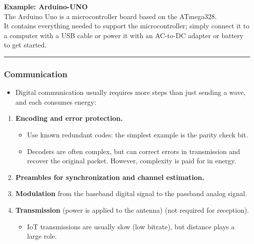 \documentclass[
]{article}
\providecommand{\tightlist}{%
  \setlength{\itemsep}{0pt}\setlength{\parskip}{0pt}}
\begin{document}
\textbf{Example: Arduino-UNO}\\
The Arduino Uno is a microcontroller board based on the ATmega328.\\
It contains everything needed to support the microcontroller; simply
connect it to a computer with a USB cable or power it with an AC-to-DC
adapter or battery to get started.

\begin{center}\rule{0.5\linewidth}{0.5pt}\end{center}

\subsubsection{Communication}\label{communication}

\begin{itemize}
\tightlist
\item
  Digital communication usually requires more steps than just sending a
  wave, and each consumes energy:
\end{itemize}

\begin{enumerate}
\tightlist
\item
  \textbf{Encoding and error protection.}

  \begin{itemize}
  \tightlist
  \item
    Use known redundant codes: the simplest example is the parity check
    bit.
  \item
    Decoders are often complex, but can correct errors in transmission
    and recover the original packet. However, complexity is paid for in
    energy.\\
  \end{itemize}
\item
  \textbf{Preambles for synchronization and channel estimation.}
\item
  \textbf{Modulation} from the baseband digital signal to the passband
  analog signal.
\item
  \textbf{Transmission} (power is applied to the antenna) (not required
  for reception).

  \begin{itemize}
  \tightlist
  \item
    IoT transmissions are usually slow (low bitrate), but distance plays
    a large role.
  \end{itemize}
\end{enumerate}
\end{document}
